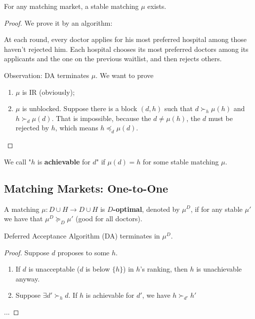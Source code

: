 \documentclass[11pt]{elegantbook}
\begin{document}
\begin{theorem}
    For any matching market, a stable matching $\mu$ exists.
\end{theorem}
\begin{proof}
    We prove it by an algorithm:
    \begin{definition}
        \normalfont
        At each round, every doctor applies for his most preferred hospital among those haven't rejected him. Each hospital chooses its most preferred doctors among its applicants and the one on the previous waitlist, and then rejects others.
    \end{definition}
    Observation: DA terminates $\mu$. We want to prove
    \begin{enumerate}
        \item $\mu$ is IR (obviously);
        \item $\mu$ is unblocked.
        \subitem Suppose there is a block $(d,h)$ such that $d\succ_h \mu(h)$ and $h\succ_d \mu(d)$. That is impossible, because the $d\neq \mu(h)$, the $d$ must be rejected by $h$, which means $h\preceq_d \mu(d)$.
    \end{enumerate}
\end{proof}

\begin{note}
    We call "$h$ is \textbf{achievable} for $d$" if $\mu(d)=h$ for some stable matching $\mu$.
\end{note}


\subsection{Matching Markets: One-to-One}
\begin{definition}
    \normalfont
    A matching $\mu: D\cup H \rightarrow D\cup H$ is \textbf{$D$-optimal}, denoted by $\mu^D$, if for any stable $\mu'$ we have that $\mu^D\succeq_D \mu'$ (good for all doctors).
\end{definition}

\begin{theorem}
    Deferred Acceptance Algorithm (DA) terminates in $\mu^D$.
\end{theorem}
\begin{proof}
    Suppose $d$ proposes to some $h$.
    \begin{enumerate}
        \item If $d$ is unacceptable ($d$ is below $\{h\}$) in $h$'s ranking, then $h$ is unachievable anyway.
        \item Suppose $\exists d'\succ_h d$. If $h$ is achievable for $d'$, we have $h\succ_{d'} h'$
    \end{enumerate}
    ...
\end{proof}
\end{document}

